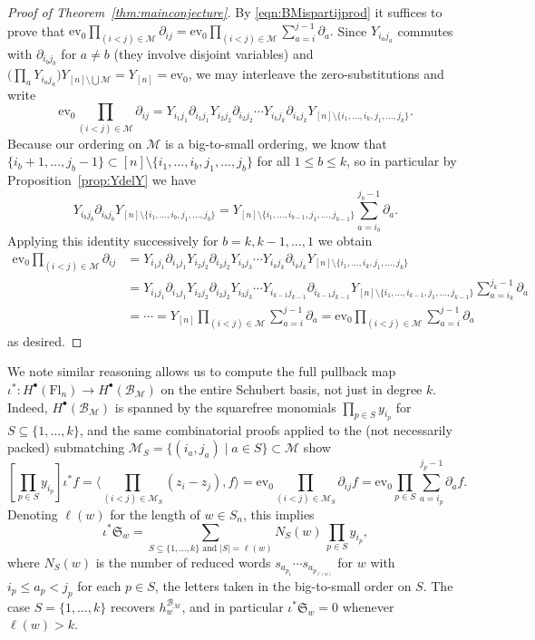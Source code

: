 \documentclass[11pt]{amsart}
\theoremstyle{definition}
\numberwithin{equation}{section}
\newcommand{\suchthat}{\;|\;}
\newcommand{\schub}[1]{\mathfrak{S}_{#1}} %
\newcommand{\ct}{\operatorname{ev_0}} %
\newcommand{\fl}[1]{\mathrm{Fl}_{#1}}
\begin{document}
\begin{proof}[Proof of Theorem~\ref{thm:mainconjecture}]
By \eqref{eqn:BMispartijprod} it suffices to prove that $\ct \prod_{(i<j)\in \mathcal{M}}\partial_{ij}=\ct \prod_{(i<j)\in \mathcal{M}}\sum_{a=i}^{j-1}\partial_a.$
Since $Y_{i_aj_a}$ commutes with $\partial_{i_bj_b}$ for $a\ne b$ (they involve disjoint variables) and $\big(\prod_{a}Y_{i_aj_a}\big)Y_{[n]\setminus\bigcup\mathcal{M}}=Y_{[n]}=\ct$, we may interleave the zero-substitutions and write
\[
\ct\prod_{(i<j)\in\mathcal{M}}\partial_{ij}=Y_{i_1j_1}\partial_{i_1j_1}Y_{i_2j_2}\partial_{i_2j_2}\cdots Y_{i_kj_k}\partial_{i_kj_k}Y_{[n]\setminus\{i_1,\dots,i_k,j_1,\dots,j_k\}}.
\]
Because our ordering on $\mathcal{M}$ is a big-to-small ordering, we know that $\{i_b+1,\ldots,j_b-1\}\subset [n]\setminus \{i_1,\ldots,i_b,j_1,\ldots,j_b\}$  for all $1\le b \le k$, so in particular by Proposition~\ref{prop:YdelY} we have $$Y_{i_bj_b}\partial_{i_bj_b}Y_{[n]\setminus\{i_1,\ldots,i_b,j_1,\ldots,j_b\}}=Y_{[n]\setminus \{i_1,\ldots,i_{b-1},j_1,\ldots,j_{b-1}\}}\sum_{a=i_b}^{j_b-1}\partial_a.$$
    Applying this identity successively for $b=k,k-1,\ldots,1$ we obtain \begin{align*}\ct \prod_{(i<j)\in \mathcal{M}}\partial_{ij}&=Y_{i_1j_1}\partial_{i_1j_1}Y_{i_2j_2}\partial_{i_2j_2}Y_{i_3j_3}\cdots Y_{i_kj_k}\partial_{i_kj_k}Y_{[n]\setminus \{i_1,\ldots,i_k,j_1,\ldots,j_k\}}\\
    &=Y_{i_1j_1}\partial_{i_1j_1}Y_{i_2j_2}\partial_{i_2j_2}Y_{i_3j_3}\cdots Y_{i_{k-1}j_{k-1}}\partial_{i_{k-1}j_{k-1}}Y_{[n]\setminus \{i_1,\ldots,i_{k-1},j_1,\ldots,j_{k-1}\}}\sum_{a=i_k}^{j_k-1}\partial_a
    \\
    &=\cdots = Y_{[n]}\prod_{(i<j)\in \mathcal{M}}\sum_{a=i}^{j-1}\partial_a=\ct \prod_{(i<j)\in \mathcal{M}}\sum_{a=i}^{j-1}\partial_a\end{align*}
    as desired.
\end{proof}

We note similar reasoning allows us to compute the full pullback map
$\iota^*\colon H^\bullet(\fl{n})\to H^\bullet(\mathcal{B}_{\mathcal{M}})$ on the entire Schubert
basis, not just in degree $k$. Indeed, $H^\bullet(\mathcal{B}_\mathcal{M})$ is
spanned by the squarefree monomials $\prod_{p\in S}y_{i_p}$ for $S\subseteq\{1,\dots,k\}$, and the same combinatorial proofs applied to the (not necessarily packed) submatching $\mathcal{M}_S=\{(i_a,j_a)\suchthat a\in S\}\subset \mathcal{M}$ show
$$[\prod_{p\in S}y_{i_p}]\iota^*f=\langle \prod_{(i<j)\in \mathcal{M}_S}(z_i-z_j),f\rangle=\ct\prod_{(i<j)\in \mathcal{M}_S}\partial_{ij}f=\ct\prod_{p\in S}\sum_{a=i_p}^{j_p-1}\partial_a f.$$
Denoting $\ell(w)$ for the length of $w\in S_n$, this implies
\begin{equation}
\label{eqref:NSw}
\iota^*\schub{w}
=\sum_{S\subseteq\{1,\dots,k\}\text{ and }|S|=\ell(w)}
N_S(w)\,\prod_{p\in S}y_{i_p},
\end{equation}
where $N_S(w)$ is the number of reduced words $s_{a_{p_1}}\cdots s_{a_{p_{\ell(w)}}}$ for
$w$ with $i_p\le a_p<j_p$ for each $p\in S$, the letters taken in the big-to-small
order on $S$. The case $S=\{1,\dots,k\}$ recovers $h^{\mathcal{B}_{\mathcal{M}}}_w$, and in
particular $\iota^*\schub{w}=0$ whenever $\ell(w)>k$.
\end{document}
